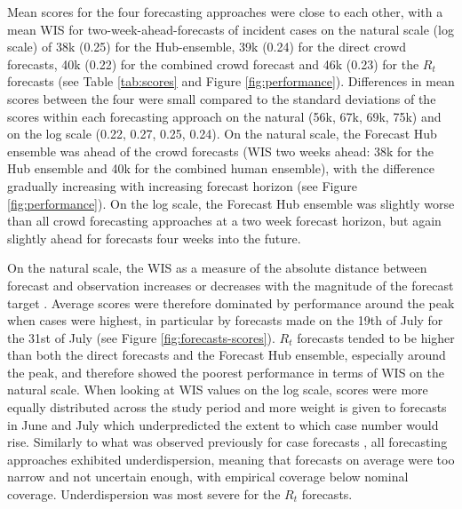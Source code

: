 \documentclass[10pt,a4paper,twocolumn]{article}
\begin{document}
Mean scores for the four forecasting approaches were close to each other, with a mean WIS for two-week-ahead-forecasts of incident cases on the natural scale (log scale) of 38k (0.25) for the Hub-ensemble, 39k (0.24) for the direct crowd forecasts, 40k (0.22) for the combined crowd forecast and 46k (0.23) for the $R_t$ forecasts (see Table \ref{tab:scores} and Figure \ref{fig:performance}). Differences in mean scores between the four were small compared to the standard deviations of the scores within each forecasting approach on the natural (56k, 67k, 69k, 75k) and on the log scale (0.22, 0.27, 0.25, 0.24). 
On the natural scale, the Forecast Hub ensemble was ahead of the crowd forecasts (WIS two weeks ahead: 38k for the Hub ensemble and 40k for the combined human ensemble), with the difference gradually increasing with increasing forecast horizon (see Figure \ref{fig:performance}). On the log scale, the Forecast Hub ensemble was slightly worse than all crowd forecasting approaches at a two week forecast horizon, but again slightly ahead for forecasts four weeks into the future. 

On the natural scale, the WIS as a measure of the absolute distance between forecast and observation increases or decreases with the magnitude of the forecast target \cite{bosseTransformationForecastsEvaluating2023, bracherEvaluatingEpidemicForecasts2021}. Average scores were therefore dominated by performance around the peak when cases were highest, in particular by forecasts made on the 19th of July for the 31st of July (see Figure \ref{fig:forecasts-scores}). $R_t$ forecasts tended to be higher than both the direct forecasts and the Forecast Hub ensemble, especially around the peak, and therefore showed the poorest performance in terms of WIS on the natural scale. When looking at WIS values on the log scale,
scores were more equally distributed across the study period and more weight is given to forecasts in June and July which underpredicted the extent to which case number would rise. Similarly to what was observed previously for case forecasts \citep{bosseComparingHumanModelbased2022, sherrattPredictivePerformanceMultimodel2022a}, all forecasting approaches exhibited underdispersion, meaning that forecasts on average were too narrow and not uncertain enough, with empirical coverage below nominal coverage. Underdispersion was most severe for the $R_t$ forecasts. 
\end{document}
